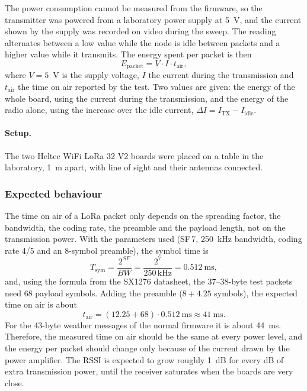 \documentclass[informe,english]{plantilla}
\begin{document}
The power consumption cannot be measured from the firmware, so the transmitter
was powered from a laboratory power supply at 5~V, and the current shown by
the supply was recorded on video during the sweep. The reading alternates
between a low value while the node is idle between packets and a higher value
while it transmits. The energy spent per packet is then
\begin{equation}
    E_{\text{packet}} = V \cdot I \cdot t_{\text{air}},
    \label{eq:energy}
\end{equation}
where $V = 5$~V is the supply voltage, $I$ the current during the transmission
and $t_{\text{air}}$ the time on air reported by the test. Two values are
given: the energy of the whole board, using the current during the
transmission, and the energy of the radio alone, using the increase over the
idle current, $\Delta I = I_{\text{TX}} - I_{\text{idle}}$.

\paragraph{Setup.} The two Heltec WiFi LoRa 32 V2 boards were placed on a
table in the laboratory, 1~m apart, with line of sight and their antennas
connected.

\subsubsection{Expected behaviour}
\label{sec:exp-toa}

The time on air of a LoRa packet only depends on the spreading factor, the
bandwidth, the coding rate, the preamble and the payload length, not on the
transmission power. With the parameters used (SF\,7, 250~kHz bandwidth, coding rate 4/5 and an
8-symbol preamble), the symbol time is
\begin{equation}
    T_{\text{sym}} = \frac{2^{SF}}{BW} = \frac{2^{7}}{250\,\text{kHz}} = 0.512~\text{ms},
\end{equation}
and, using the formula from the SX1276 datasheet, the 37--38-byte test packets
need 68 payload symbols. Adding the preamble ($8 + 4.25$ symbols), the
expected time on air is about
\begin{equation}
    t_{\text{air}} = (12.25 + 68) \cdot 0.512~\text{ms} \approx 41~\text{ms}.
\end{equation}
For the 43-byte weather messages of the normal firmware it is about 44~ms.
Therefore, the measured time on air should be the same at every power level,
and the energy per packet should change only because of the current drawn by
the power amplifier. The RSSI is expected to grow roughly 1~dB for every dB of
extra transmission power, until the receiver saturates when the boards are
very close.
\end{document}
